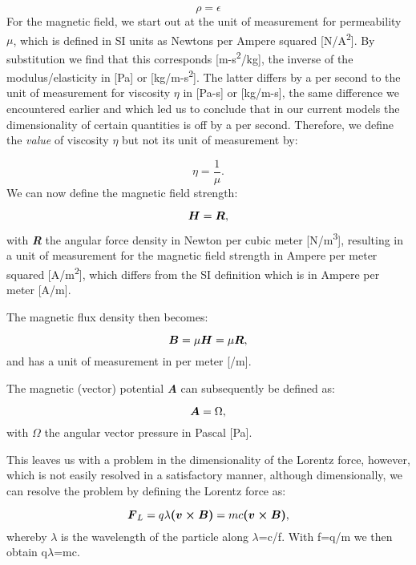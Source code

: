 \documentclass[a4paper]{article}
\newcommand\textstyleNone[1]{#1}
\newcommand\boldsubformula[1]{\text{\mathversion{bold}$#1$}}
\begin{document}
\begin{equation}
\rho =\epsilon 
\end{equation}
For the magnetic field, we start out at the unit of measurement for permeability $\mu $, which is defined in SI units as
Newtons per Ampere squared [N/A\textsuperscript{2}]. By substitution we find that this corresponds
[m-s\textsuperscript{2}/kg], the inverse of the modulus/elasticity in [Pa] or [kg/m-s\textsuperscript{2}]. The latter
differs by a per second to the unit of measurement for viscosity $\eta $ in [Pa-s] or [kg/m-s], the same difference we
encountered earlier and which led us to conclude that in our current models the dimensionality of certain quantities is
off by a per second. Therefore, we define the \textit{value} of viscosity $\eta $ but not its unit of measurement by:

\begin{equation}
\eta =\frac 1{\mu }.
\end{equation}
We can now define the magnetic field strength:

\begin{equation}
\boldsubformula H=\boldsubformula R,
\end{equation}
with \textbf{\textit{R}} the angular force density in Newton per cubic meter [N/m\textsuperscript{3}], resulting in a
unit of measurement for the magnetic field strength in Ampere per meter squared [A/m\textsuperscript{2}], which differs
from the SI definition which is in Ampere per meter [A/m]. 

The magnetic flux density then becomes:

\begin{equation}
\boldsubformula B=\mu \boldsubformula H=\mu \boldsubformula R,
\end{equation}
and has a unit of measurement in per meter [/m].

The magnetic (vector) potential \textbf{\textit{A}} can subsequently be defined as:

\begin{equation}
\boldsubformula A=\Omega ,
\end{equation}
with \textbf{\textit{$\Omega $}} the angular vector pressure in Pascal [Pa].

{
\textstyleNone{This leaves us with a problem in the dimensionality of the Lorentz force, however, which is not easily
resolved in a satisfactory manner, although dimensionally, we can resolve the problem by defining the Lorentz force
as:}}

\begin{equation}
\boldsubformula F_L=q\lambda \boldsubformula{(v\times B)}=mc\boldsubformula{(v\times \boldsubformula B)},
\end{equation}
whereby $\lambda $ is the wavelength of the particle along $\lambda $=c/f. With f=q/m we then obtain q$\lambda $=mc.
\end{document}

